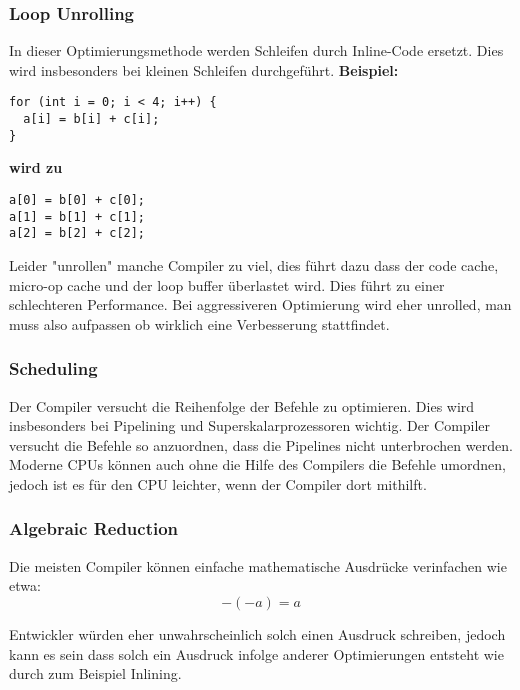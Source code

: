 \documentclass{article}
\begin{document}
\subsubsection{Loop Unrolling}
In dieser Optimierungsmethode werden Schleifen durch Inline-Code ersetzt. Dies wird insbesonders bei kleinen Schleifen durchgeführt. 
\textbf{Beispiel:}
\begin{verbatim}
for (int i = 0; i < 4; i++) {
  a[i] = b[i] + c[i];
}
\end{verbatim}
\textbf{wird zu}
\begin{verbatim}
a[0] = b[0] + c[0];
a[1] = b[1] + c[1];
a[2] = b[2] + c[2];
\end{verbatim}

Leider "unrollen" manche Compiler zu viel, dies führt dazu dass der code cache, micro-op cache und der loop buffer überlastet wird. Dies führt zu einer schlechteren Performance. Bei aggressiveren Optimierung wird eher unrolled, man muss also aufpassen ob wirklich eine Verbesserung stattfindet.

\subsubsection{Scheduling}
Der Compiler versucht die Reihenfolge der Befehle zu optimieren. Dies wird insbesonders bei Pipelining und Superskalarprozessoren wichtig. Der Compiler versucht die Befehle so anzuordnen, dass die Pipelines nicht unterbrochen werden. \\
Moderne CPUs können auch ohne die Hilfe des Compilers die Befehle umordnen, jedoch ist es für den CPU leichter, wenn der Compiler dort mithilft.

\subsubsection{Algebraic Reduction}
Die meisten Compiler können einfache mathematische Ausdrücke verinfachen wie etwa: \[
  -(-a) = a
\] 

Entwickler würden eher unwahrscheinlich solch einen Ausdruck schreiben, jedoch kann es sein dass solch ein Ausdruck infolge anderer Optimierungen entsteht wie durch zum Beispiel Inlining.
\end{document}
